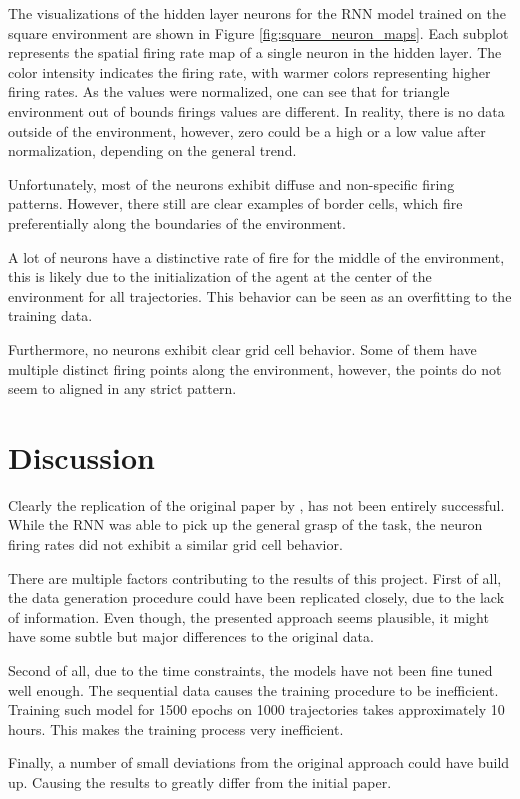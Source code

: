 \documentclass{article}
\begin{document}
The visualizations of the hidden layer neurons for the RNN model trained on the square environment are shown in Figure \ref{fig:square_neuron_maps}. Each subplot represents the spatial firing rate map of a single neuron in the hidden layer. The color intensity indicates the firing rate, with warmer colors representing higher firing rates. As the values were normalized, one can see that for triangle environment out of bounds firings values are different. In reality, there is no data outside of the environment, however, zero could be a high or a low value after normalization, depending on the general trend.  

Unfortunately, most of the neurons exhibit diffuse and non-specific firing patterns. However, there still are clear examples of border cells, which fire preferentially along the boundaries of the environment. 

A lot of neurons have a distinctive rate of fire for the middle of the environment, this is likely due to the initialization of the agent at the center of the environment for all trajectories. This behavior can be seen as an overfitting to the training data.

Furthermore, no neurons exhibit clear grid cell behavior. Some of them have multiple distinct firing points along the environment, however, the points do not seem to aligned in any strict pattern.


\section{Discussion}
Clearly the replication of the original paper by \citep{chaplot2018active}, has not been entirely successful. While the RNN was able to pick up the general grasp of the task, the neuron firing rates did not exhibit a similar grid cell behavior. 

There are multiple factors contributing to the results of this project. First of all, the data generation procedure could have been replicated closely, due to the lack of information. Even though, the presented approach seems plausible, it might have some subtle but major differences to the original data. 

Second of all, due to the time constraints, the models have not been fine tuned well enough. The sequential data causes the training procedure to be inefficient. Training such model for 1500 epochs on 1000 trajectories takes approximately 10 hours. This makes the training process very inefficient. 

Finally, a number of small deviations from the original approach could have build up. Causing the results to greatly differ from the initial paper.









\end{document}
